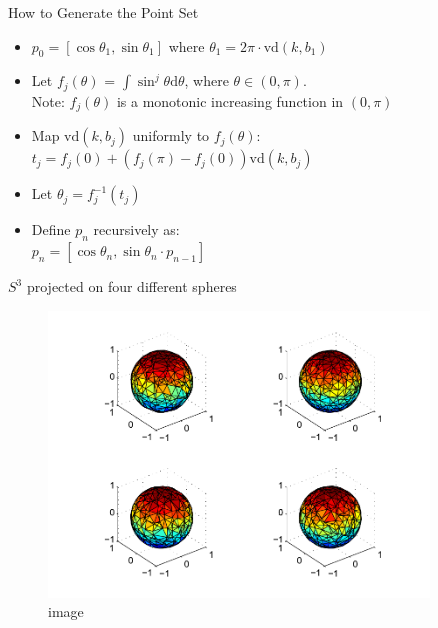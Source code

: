 \documentclass[10pt,ignorenonframetext,serif,onlymath]{beamer}
\begin{document}
\begin{frame}{How to Generate the Point Set}
\protect\hypertarget{how-to-generate-the-point-set}{}

\begin{itemize}
\item
  \(p_0 = [\cos\theta_1, \sin\theta_1]\) where
  \(\theta_1 = 2\pi\cdot\mathrm{vd}(k,b_1)\)
\item
  Let \(f_j(\theta)\) = \(\int\sin^j\theta \mathrm{d}\theta\), where
  \(\theta\in (0,\pi)\).\\
  Note: \(f_j(\theta)\) is a monotonic increasing function in
  \((0,\pi)\)
\item
  Map \(\mathrm{vd}(k,b_j)\) uniformly to \(f_j(\theta)\):\\
  \(t_j = f_j(0) + (f_j(\pi) - f_j(0)) \mathrm{vd}(k,b_j)\)
\item
  Let \(\theta_j = f_j^{-1}(t_j)\)
\item
  Define \(p_n\) recursively as:\\
  \(p_n = [\cos\theta_n, \sin\theta_n \cdot p_{n-1}]\)
\end{itemize}

\end{frame}

\begin{frame}{\(S^3\) projected on four different spheres}
\protect\hypertarget{s3-projected-on-four-different-spheres}{}

\begin{figure}
\centering
\includegraphics[width=0.9\textwidth,height=\textheight]{res_proj.pdf}
\caption{image}
\end{figure}

\end{frame}
\end{document}
